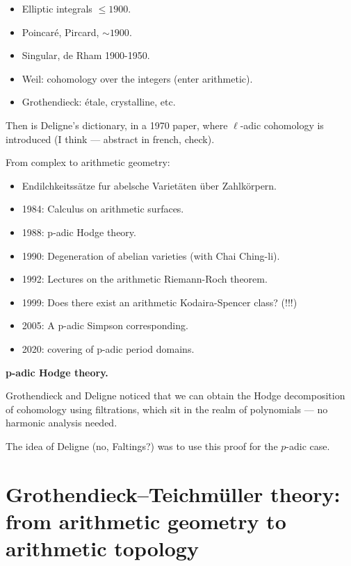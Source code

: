 \medskip\noindent
\begin{itemize}
\item Elliptic integrals $\leq 1900$.
\item Poincaré, Pircard, $\sim 1900$.
\item Singular, de Rham 1900-1950.
\item Weil: cohomology over the integers
(enter arithmetic).
\item Grothendieck: étale, crystalline, etc.
\end{itemize}

\noindent
Then is Deligne's dictionary,
in a 1970 paper, where $\ell$-adic
cohomology is introduced
(I think --- abstract in french, check).

\medskip\noindent
From complex to arithmetic geometry:

\begin{itemize}
\item Endilchkeitssätze
fur abelsche Varietäten über Zahlkörpern.
\item 1984: Calculus on arithmetic surfaces.
\item 1988: p-adic Hodge theory.
\item 1990: Degeneration of abelian
varieties (with Chai Ching-li).
\item 1992: Lectures on the
arithmetic Riemann-Roch theorem.
\item 1999: Does there exist an arithmetic
Kodaira-Spencer class? (!!!)
\item 2005: A p-adic Simpson corresponding.
\item 2020: covering of p-adic period
domains.
\end{itemize}

\medskip\noindent
{\bf p-adic Hodge theory.}

Grothendieck and Deligne
noticed that we can obtain
the Hodge decomposition of cohomology
using filtrations, which sit
in the realm of polynomials ---
no harmonic analysis needed.

The idea of Deligne (no, Faltings?) 
was to use
this proof for the $p$-adic case.

\section{Grothendieck--Teichm\"uller theory: from arithmetic geometry to arithmetic topology}
\label{section-grothendieck-teichmuller-arithmetic-topology}

